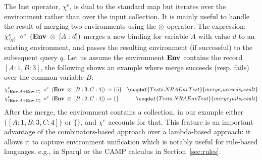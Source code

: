 The last operator, $\chi^e$, is dual to the standard map but
iterates over the environment rather than over the input collection. It is
mainly useful to handle the result of merging two environments using
the $\otimes$ operator. The expression:
${\chi^e_{\left\langle{q}\right\rangle}\;\circ^{e}\;\left(\textup{\textbf{{Env}}}\;\otimes\;[A:d]\right)}$
merges a new binding for variable $A$ with value $d$ to an existing
environment, and passes the resulting environment (if successful) to
the subsequent query $q$. Let us assume the environment $\textup{\textbf{{Env}}}$
contains the record $[A : 1, B: 3]$, the following shows an example
where merge succeeds (resp. fails) over the common variable $B$:
\begin{align*}
  \qmapenv{\qENV.A+\qENV.C}\;\circ^{e}\;\left(\qENV\;\opmergeconcat\;[B:3,C:4]\right) & \Rightarrow \{ 5 \}&\coqdef{Tests.NRAEnvTest}{merge_succeeds_result}\\
  \qmapenv{\qENV.A+\qENV.C}\;\circ^{e}\;\left(\qENV\;\opmergeconcat\;[B:2,C:4]\right) & \Rightarrow \{ \}&\coqdef{Tests.NRAEnvTest}{merge_fails_result}
\end{align*}
After the merge, the environment contains a collection, in our example
either $\{[A:1, B:3, C:4]\}$ or $\{\}$, and $\chi^e$ accounts for
that. This feature is an important advantage of the combinators-based
approach over a lambda-based approach: it allows it to capture
environment unification which is notably useful for rule-based languages,
e.g., in Sparql or the CAMP calculus in Section~\ref{sec:rules}.

